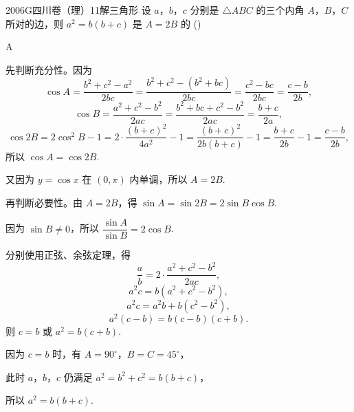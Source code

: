 
\begin{problem}{2006}{G}{四川卷（理）}{11}{解三角形}
设 $ a $，$ b $，$ c $ 分别是 $ \triangle ABC $ 的三个内角 $ A $，$ B $，$ C $ 所对的边，则 $ a^{2}=b(b+c) $ 是 $ A=2B $ 的 (\hspace{1cm})
\begin{choices}
\end{choices}
\end{problem}

\begin{answer}
A
\end{answer}

\begin{solutions}
先判断充分性。因为
$$
\cos A=\frac{b^{2}+c^{2}-a^{2}}{2bc}=\frac{b^{2}+c^{2}-(b^{2}+bc)}{2bc}=\frac{c^{2}-bc}{2bc}=\frac{c-b}{2b},
$$
$$
\cos B=\frac{a^{2}+c^{2}-b^{2}}{2ac}=\frac{b^{2}+bc+c^{2}-b^{2}}{2ac}=\frac{b+c}{2a},
$$
$$
\cos 2B=2\cos^{2}B-1=2\cdot\frac{(b+c)^{2}}{4a^{2}}-1=\frac{(b+c)^{2}}{2b(b+c)}-1=\frac{b+c}{2b}-1=\frac{c-b}{2b},
$$
所以 $ \cos A=\cos 2B $.

又因为 $ y=\cos x $ 在 $ (0,\pi) $ 内单调，所以 $ A=2B $.

再判断必要性。由 $ A=2B $，得 $ \sin A=\sin 2B=2\sin B\cos B $.

因为 $ \sin B\neq 0 $，所以 $ \dfrac{\sin A}{\sin B}=2\cos B $.

分别使用正弦、余弦定理，得
$$
\frac{a}{b}=2\cdot\frac{a^{2}+c^{2}-b^{2}}{2ac},
$$
$$
a^{2}c=b(a^{2}+c^{2}-b^{2}),
$$
$$
a^{2}c=a^{2}b+b(c^{2}-b^{2}),
$$
$$
a^{2}(c-b)=b(c-b)(c+b).
$$
则 $ c=b $ 或 $ a^{2}=b(c+b) $.

因为 $ c=b $ 时，有 $ A=90^{\circ} $，$ B=C=45^{\circ} $，

此时 $ a $，$ b $，$ c $ 仍满足 $ a^{2}=b^{2}+c^{2}=b(b+c) $，

所以 $ a^{2}=b(b+c) $.
\end{solutions}